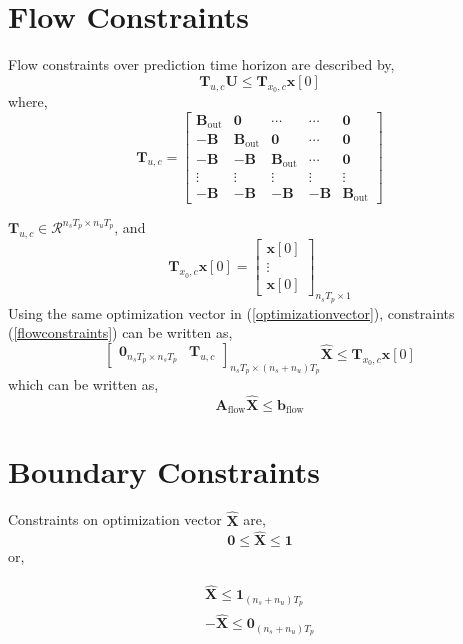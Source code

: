 \documentclass{article}
\begin{document}
\section{Flow Constraints}
Flow constraints over prediction time horizon are described by,
\begin{equation}
\label{flowconstraints}
\mathbf{T}_{u,c} \mathbf{U} \leq \mathbf{T}_{x_0,c} \mathbf{x}[0]
\end{equation}
where,
\[
\mathbf{T}_{u,c} =
\begin{bmatrix}
\mathbf{B}_{\text{out}} & \mathbf{0} & \cdots & \cdots & \mathbf{0}\\
- \mathbf{B} & \mathbf{B}_{\text{out}} & \mathbf{0} & \cdots & \mathbf{0}\\
- \mathbf{B} & -\mathbf{B} & \mathbf{B}_{\text{out}} & \cdots & \mathbf{0}\\
\vdots & \vdots & \vdots & \vdots & \vdots\\
- \mathbf{B} & - \mathbf{B} & - \mathbf{B} & - \mathbf{B} & \mathbf{B}_{\text{out}}

\end{bmatrix}
\]

$\mathbf{T}_{u,c} \in \mathcal{R}^{n_s T_p \times n_u T_p}$, and 
\[
\mathbf{T}_{x_0,c} \mathbf{x}[0] =
\begin{bmatrix}
\mathbf{x}[0]\\
\vdots \\
\mathbf{x}[0]
\end{bmatrix}_{n_s T_p \times 1}
\]
Using the same optimization vector in (\ref{optimizationvector}), constraints (\ref{flowconstraints}) can be written as,
\begin{equation}
\label{compactflowconstraints}
\begin{bmatrix}
\mathbf{0}_{n_s T_p \times n_s T_p} & \mathbf{T}_{u,c}
\end{bmatrix}_{n_s T_p \times (n_s+n_u)T_p}
\hat{\mathbf{X}} \leq  \mathbf{T}_{x_0,c} \mathbf{x}[0]
\end{equation}
which can be written as,
\[
\mathbf{A}_{\text{flow}} \hat{\mathbf{X}} \leq \mathbf{b}_{\text{flow}}
\]

\section{Boundary Constraints}
Constraints on optimization vector $\hat{\mathbf{X}}$ are,
\[
\mathbf{0} \leq \hat{\mathbf{X}} \leq \mathbf{1}
\]
or,

\begin{align*}
\hat{\mathbf{X}} \leq \mathbf{1}_{(n_s+n_u)T_p} \\
-\hat{\mathbf{X}} \leq \mathbf{0}_{(n_s+n_u)T_p}
\end{align*}
\end{document}

